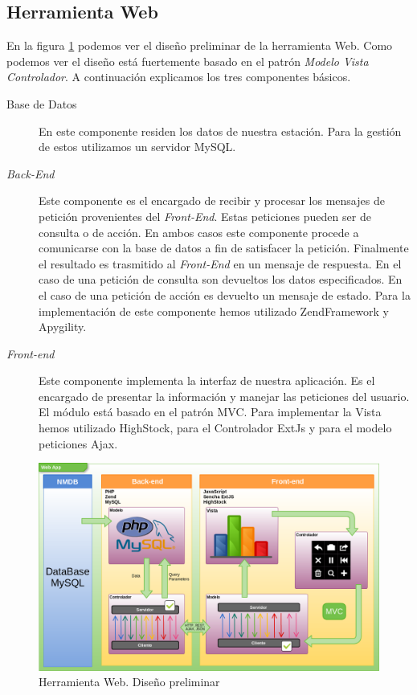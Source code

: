 	\subsection{Herramienta Web}
		En la figura \ref{fig:herramienta_web_preliminar} podemos ver el diseño preliminar de la herramienta Web. Como podemos ver el diseño
		está fuertemente basado en el patrón \emph{Modelo Vista Controlador}\cite{MVCWiki}. A continuación explicamos los tres componentes
		básicos.
		\begin{description}
			\item[Base de Datos]    
				En este componente residen los datos de nuestra estación. Para la gestión de estos utilizamos un servidor
				MySQL\cite{MySql}.
			\item[\emph{Back-End}]
				Este componente es el encargado de recibir y procesar los mensajes de petición provenientes del \emph{Front-End}.
				Estas peticiones pueden ser de consulta o de acción. En ambos casos este componente procede a comunicarse con la base
				de datos a fin de satisfacer la petición. Finalmente el resultado es trasmitido al \emph{Front-End} en un mensaje de
				respuesta. En el caso de una petición de consulta son devueltos los datos especificados. En el caso de una petición de
				acción es devuelto un mensaje de estado. Para la implementación de este componente hemos utilizado
				ZendFramework\cite{ZF} y Apygility\cite{Apigility}.
			\item[\emph{Front-end}] 
				Este componente implementa la interfaz de nuestra aplicación. Es el encargado de presentar la información y manejar
				las peticiones del usuario. El módulo está basado en el patrón MVC. Para implementar la Vista hemos utilizado
				HighStock\cite{HighStock}, para el Controlador ExtJs\cite{ExtJs} y para el modelo peticiones Ajax\cite{AjaxWiki}.
		\end{description}
		\begin{figure}[h]
			\centering
			\includegraphics[keepaspectratio, width=1\textwidth]{./img/herramienta_web_preliminar.png}
			\caption{Herramienta Web. Diseño preliminar}
			\label{fig:herramienta_web_preliminar}
		\end{figure}
